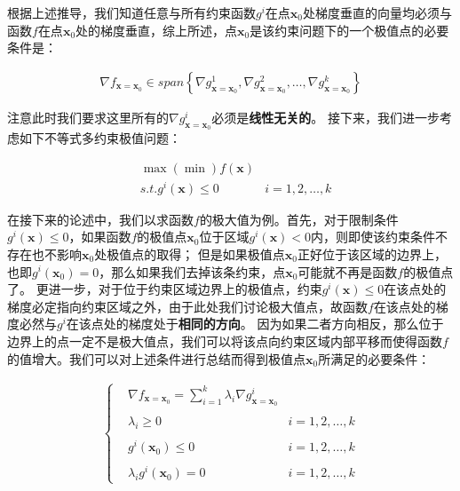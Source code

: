 \documentclass[UTF8]{book}
\begin{document}
根据上述推导，我们知道任意与所有约束函数$g^i$在点$\mathbf{x}_0$处梯度垂直的向量均必须与函数$f$在点$\mathbf{x}_0$处的梯度垂直，综上所述，点$\mathbf{x}_0$是该约束问题下的一个极值点的必要条件是：
\begin{large}
    \begin{equation}
        \begin{aligned}
            \nabla f_{\mathbf{x}=\mathbf{x}_0} \in span \left \{ \nabla g_{\mathbf{x}=\mathbf{x}_0}^1,\nabla g_{\mathbf{x}=\mathbf{x}_0}^2,\dots,\nabla g_{\mathbf{x}=\mathbf{x}_0}^k \right \}
            \nonumber
        \end{aligned}
    \end{equation}
\end{large}
注意此时我们要求这里所有的$\nabla g_{\mathbf{x}=\mathbf{x}_0}^i$必须是\textbf{线性无关的}。
接下来，我们进一步考虑如下不等式多约束极值问题：
\begin{large}
    \begin{equation}
        \begin{aligned}
            &\max(\min) f(\mathbf{x})& \\
            &s.t. g^i(\mathbf{x}) \le 0& i=1,2,\dots,k
            \nonumber
        \end{aligned}
    \end{equation}
\end{large}
在接下来的论述中，我们以求函数$f$的极大值为例。首先，对于限制条件$g^i(\mathbf{x}) \le 0$，如果函数$f$的极值点$\mathbf{x}_0$位于区域$g^i(\mathbf{x}) < 0$内，则即使该约束条件不存在也不影响$\mathbf{x}_0$处极值点的取得；
但是如果极值点$\mathbf{x}_0$正好位于该区域的边界上，也即$g^i(\mathbf{x}_0)=0$，那么如果我们去掉该条约束，点$\mathbf{x}_0$可能就不再是函数$f$的极值点了。
更进一步，对于位于约束区域边界上的极值点，约束$g^i(\mathbf{x}) \le 0$在该点处的梯度必定指向约束区域之外，由于此处我们讨论极大值点，故函数$f$在该点处的梯度必然与$g^i$在该点处的梯度处于\textbf{相同的方向}。
因为如果二者方向相反，那么位于边界上的点一定不是极大值点，我们可以将该点向约束区域内部平移而使得函数$f$的值增大。我们可以对上述条件进行总结而得到极值点$\mathbf{x}_0$所满足的必要条件：
\begin{large}
    \begin{equation}
        \begin{aligned}
            \left\{\begin{matrix}
                &\displaystyle{\nabla f_{\mathbf{x}=\mathbf{x}_0}=\sum_{i=1}^{k} \lambda_i \nabla g_{\mathbf{x}=\mathbf{x}_0}^i} & \\
                & & \\
                &\lambda_i \ge 0 & i=1,2,\dots,k \\
                & & \\
                &g^i(\mathbf{x}_0) \le 0 & i=1,2,\dots,k \\
                & & \\
                &\lambda_i g^i(\mathbf{x}_0)=0 & i=1,2,\dots,k
                \end{matrix}\right.
            \nonumber
        \end{aligned}
    \end{equation}
\end{large}
\end{document}
